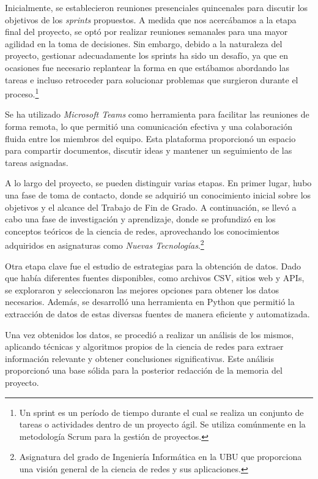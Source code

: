 Inicialmente, se establecieron reuniones presenciales quincenales para discutir los objetivos de 
los \textit{sprints} propuestos. A medida que nos acercábamos a la etapa final del proyecto, se optó por 
realizar reuniones semanales para una mayor agilidad en la toma de decisiones. Sin embargo, debido 
a la naturaleza del proyecto, gestionar adecuadamente los sprints ha sido un desafío, ya que en 
ocasiones fue necesario replantear la forma en que estábamos abordando las tareas e incluso 
retroceder para solucionar problemas que surgieron durante el proceso.\footnote{Un sprint es un 
período de tiempo durante el cual se realiza un conjunto de tareas o actividades dentro de un 
proyecto ágil. Se utiliza comúnmente en la metodología Scrum para la gestión de proyectos.}

Se ha utilizado \textit{Microsoft Teams} como herramienta para facilitar las reuniones de forma remota, 
lo que permitió una comunicación efectiva y una colaboración fluida entre los miembros del equipo. 
Esta plataforma proporcionó un espacio para compartir documentos, discutir ideas y mantener un 
seguimiento de las tareas asignadas.

A lo largo del proyecto, se pueden distinguir varias etapas. En primer lugar, hubo una fase de 
toma de contacto, donde se adquirió un conocimiento inicial sobre los objetivos y el alcance del 
Trabajo de Fin de Grado. A continuación, se llevó a cabo una fase de investigación y aprendizaje, 
donde se profundizó en los conceptos teóricos de la ciencia de redes, aprovechando los conocimientos 
adquiridos en asignaturas como \textit{Nuevas Tecnologías}.\footnote{Asignatura del grado de Ingeniería 
Informática en la UBU que proporciona una visión general de la ciencia de redes y sus aplicaciones.}

Otra etapa clave fue el estudio de estrategias para la obtención de datos. Dado que había 
diferentes fuentes disponibles, como archivos CSV, sitios web y APIs, se exploraron y 
seleccionaron las mejores opciones para obtener los datos necesarios. Además, se desarrolló 
una herramienta en Python que permitió la extracción de datos de estas diversas fuentes de 
manera eficiente y automatizada.

Una vez obtenidos los datos, se procedió a realizar un análisis de los mismos, aplicando técnicas 
y algoritmos propios de la ciencia de redes para extraer información relevante y obtener conclusiones 
significativas. Este análisis proporcionó una base sólida para la posterior redacción de la memoria 
del proyecto.